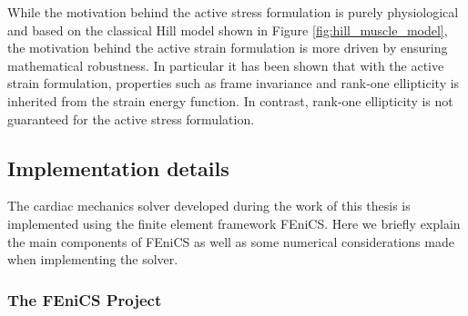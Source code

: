 While the motivation behind the active stress formulation is purely
physiological and based on the classical Hill model shown in Figure
\ref{fig:hill_muscle_model}, the motivation behind the active strain
formulation is more driven by ensuring mathematical robustness. In
particular it has been shown \cite{ambrosi2012active} that with the
active strain formulation, properties such as frame invariance and
rank-one ellipticity is inherited from the strain energy function. In
contrast, rank-one ellipticity is not guaranteed for the active stress
formulation.  





\subsection{Implementation details}
The cardiac mechanics solver developed during the work of this thesis
is implemented using the finite element framework FEniCS. Here we
briefly explain the main components of FEniCS as well as some
numerical considerations made when implementing the solver.





\subsubsection{The FEniCS Project}
\label{sec:fenics}

